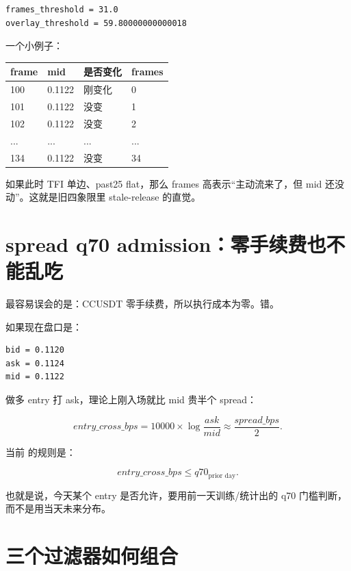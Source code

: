 \begin{lstlisting}
frames_threshold = 31.0
overlay_threshold = 59.80000000000018
\end{lstlisting}

一个小例子：

\begin{longtable}{p{}p{}p{}p{}}
\toprule
frame & mid & 是否变化 & frames \\
\midrule
100 & 0.1122 & 刚变化 & 0 \\
101 & 0.1122 & 没变 & 1 \\
102 & 0.1122 & 没变 & 2 \\
... & ... & ... & ... \\
134 & 0.1122 & 没变 & 34 \\
\bottomrule
\end{longtable}

如果此时 TFI 单边、past25 flat，那么 frames 高表示“主动流来了，但 mid 还没动”。这就是旧四象限里 stale-release 的直觉。

\section{spread q70 admission：零手续费也不能乱吃}

最容易误会的是：CCUSDT 零手续费，所以执行成本为零。错。

如果现在盘口是：

\begin{lstlisting}
bid = 0.1120
ask = 0.1124
mid = 0.1122
\end{lstlisting}

做多 entry 打 ask，理论上刚入场就比 mid 贵半个 spread：

\[
entry\_cross\_bps
= 10000 \times \log\frac{ask}{mid}
\approx \frac{spread\_bps}{2}.
\]

当前  的规则是：

\[
entry\_cross\_bps \le q70_{\text{prior day}}.
\]

也就是说，今天某个 entry 是否允许，要用前一天训练/统计出的 q70 门槛判断，而不是用当天未来分布。


\section{三个过滤器如何组合}

